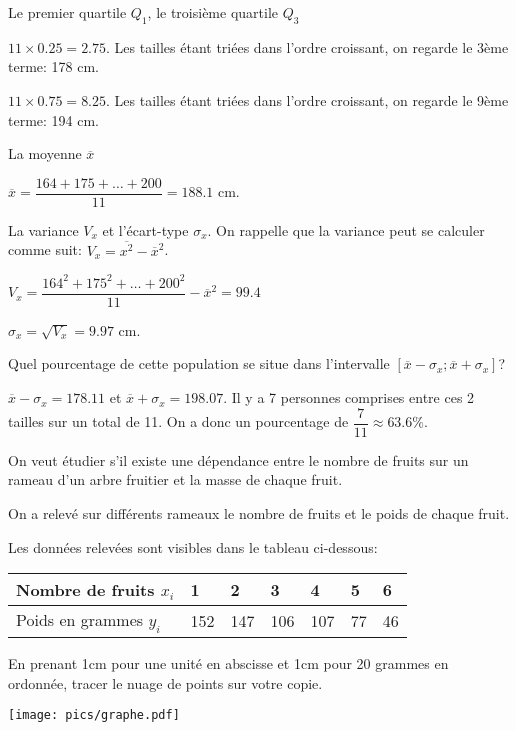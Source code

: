 \documentclass[a4paper,12pt]{scrartcl}
\begin{document}
\question{}
Le premier quartile $Q_1$, le troisième quartile $Q_3$

$11 \times 0.25 = 2.75$. Les tailles étant triées dans l'ordre croissant, on regarde le 3ème terme: 178 cm.

$11 \times 0.75 = 8.25$. Les tailles étant triées dans l'ordre croissant, on regarde le 9ème terme: 194 cm.

\question{}
La moyenne $\overline{x}$

$\overline{x} = \dfrac{164+175+\ldots+200}{11} = 188.1$ cm.

\question{}
La variance $V_x$ et l'écart-type $\sigma_x$. On rappelle que la variance peut se calculer comme suit: $V_x = \overline{x^2} - \overline{x}^2$.

$V_x = \dfrac{164^2+175^2+\ldots+200^2}{11} - \overline{x}^2 = 99.4$

$\sigma_x = \sqrt{V_x} = 9.97$ cm.

\question{}
Quel pourcentage de cette population se situe dans l'intervalle $[\overline{x} - \sigma_x ; \overline{x} + \sigma_x]$?

$\overline{x} - \sigma_x = 178.11$ et $\overline{x} + \sigma_x = 198.07$. Il y a 7 personnes comprises entre ces 2 tailles sur un total de 11. On a donc un pourcentage de $\dfrac{7}{11} \approx 63.6 \%$.


On veut étudier s'il existe une dépendance entre le nombre de fruits sur un rameau d'un arbre fruitier et la masse de chaque fruit. 

On a relevé sur différents rameaux le nombre de fruits et le poids de chaque fruit. 

Les données relevées sont visibles dans le tableau ci-dessous:

\begin{center}
\begin{tabular}{|l|l|l|l|l|l|l|}
\hline
Nombre de fruits $x_i$       & 1   & 2   & 3   & 4   & 5  & 6  \\ \hline
Poids en grammes $y_i$ & 152 & 147 & 106 & 107 & 77 & 46 \\ \hline
\end{tabular}
\end{center}

\question{}
En prenant 1cm pour une unité en abscisse et 1cm pour 20 grammes en ordonnée, tracer le nuage de points sur votre copie.

\begin{center}
\texttt{[image: pics/graphe.pdf]}
\end{center}
\end{document}
